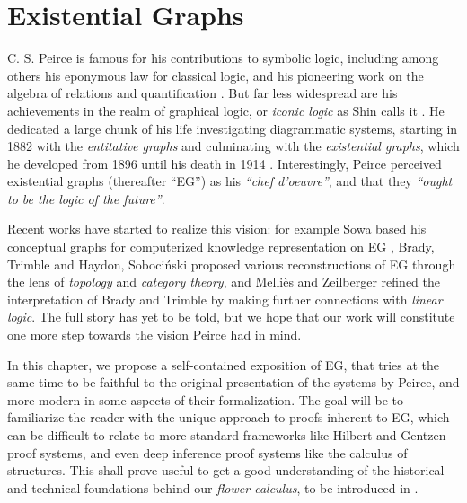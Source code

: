 \setchapterpreamble[u]{\margintoc}
\chapter{Existential Graphs}

C. S. Peirce is famous for his contributions to symbolic logic, including among
others his eponymous law for classical logic, and his pioneering work on the
algebra of relations and quantification \cite{peirce_algebra_1885}. But far less
widespread are his achievements in the realm of graphical logic, or \emph{iconic
logic} as Shin calls it \cite{10.7551/mitpress/3633.001.0001}. He dedicated a
large chunk of his life investigating diagrammatic systems, starting in 1882
with the \emph{entitative graphs} and culminating with the \emph{existential
graphs}, which he developed from 1896 until his death in 1914
\cite{Roberts+1973}. Interestingly, Peirce perceived existential graphs
(thereafter ``EG'') as his \textit{``chef d'oeuvre''}, and that they
\textit{``ought to be the logic of the future''}.

Recent works have started to realize this vision: for example Sowa based his
conceptual graphs for computerized knowledge representation on EG
\cite{sowa_conceptual_1976}, Brady, Trimble
\cite{brady_categorical_2000}\cite{brady_string_nodate} and Haydon, Sobociński
\cite{pietarinen_compositional_2020} proposed various reconstructions of EG
through the lens of \emph{topology} and \emph{category theory}, and Melliès and
Zeilberger \cite{mellies_bifibrational_2016} refined the interpretation of Brady
and Trimble by making further connections with \emph{linear
logic}\cite{girard-linear-1987}. The full story has yet to be told, but we hope
that our work will constitute one more step towards the vision Peirce had in
mind.

In this chapter, we propose a self-contained exposition of EG, that tries at the
same time to be faithful to the original presentation of the systems by Peirce,
and more modern in some aspects of their formalization. The goal will be to
familiarize the reader with the unique approach to proofs inherent to EG, which
can be difficult to relate to more standard frameworks like Hilbert and Gentzen
proof systems, and even deep inference proof systems like the calculus of
structures. This shall prove useful to get a good understanding of the
historical and technical foundations behind our \emph{flower calculus}, to be
introduced in .

